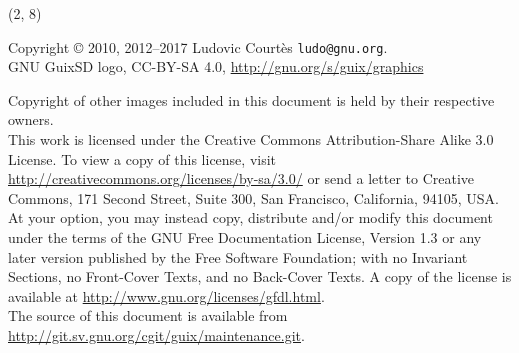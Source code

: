 \documentclass{beamer}
\begin{document}
\begin{frame}{}

  \begin{textblock}{12}(2, 8)
    \tiny{
      Copyright \copyright{} 2010, 2012--2017 Ludovic Courtès \texttt{ludo@gnu.org}.\\[3.0mm]
      GNU GuixSD logo, CC-BY-SA 4.0, \url{http://gnu.org/s/guix/graphics}

      Copyright of other images included in this document is held by
      their respective owners.
      \\[3.0mm]
      This work is licensed under the \alert{Creative Commons
        Attribution-Share Alike 3.0} License.  To view a copy of this
      license, visit
      \url{http://creativecommons.org/licenses/by-sa/3.0/} or send a
      letter to Creative Commons, 171 Second Street, Suite 300, San
      Francisco, California, 94105, USA.
      \\[2.0mm]
      At your option, you may instead copy, distribute and/or modify
      this document under the terms of the \alert{GNU Free Documentation
        License, Version 1.3 or any later version} published by the Free
      Software Foundation; with no Invariant Sections, no Front-Cover
      Texts, and no Back-Cover Texts.  A copy of the license is
      available at \url{http://www.gnu.org/licenses/gfdl.html}.
      \\[2.0mm]
      The source of this document is available from
      \url{http://git.sv.gnu.org/cgit/guix/maintenance.git}.
    }
  \end{textblock}
\end{frame}
\end{document}
